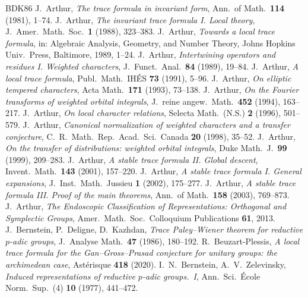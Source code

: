 \documentclass[12pt,letterpaper]{article}
\numberwithin{equation}{section}
\theoremstyle{plain}
\theoremstyle{definition}
\theoremstyle{remark}
\begin{document}
\begin{thebibliography}{BDK86}
 J.~Arthur, \emph{The trace formula in invariant form}, Ann.\ of Math.\ \textbf{114} (1981), 1--74.
 J.~Arthur, \emph{The invariant trace formula I. Local theory}, J.\ Amer.\ Math.\ Soc.\ \textbf{1} (1988), 323--383.
 J.~Arthur, \emph{Towards a local trace formula}, in: Algebraic Analysis, Geometry, and Number Theory, Johns Hopkins Univ.\ Press, Baltimore, 1989, 1--24.
 J.~Arthur, \emph{Intertwining operators and residues I. Weighted characters}, J.\ Funct.\ Anal.\ \textbf{84} (1989), 19--84.
 J.~Arthur, \emph{A local trace formula}, Publ.\ Math.\ IH\'ES \textbf{73} (1991), 5--96.
 J.~Arthur, \emph{On elliptic tempered characters}, Acta Math.\ \textbf{171} (1993), 73--138.
 J.~Arthur, \emph{On the Fourier transforms of weighted orbital integrals}, J.\ reine angew.\ Math.\ \textbf{452} (1994), 163--217.
 J.~Arthur, \emph{On local character relations}, Selecta Math.\ (N.S.) \textbf{2} (1996), 501--579.
 J.~Arthur, \emph{Canonical normalization of weighted characters and a transfer conjecture}, C.\ R.\ Math.\ Rep.\ Acad.\ Sci.\ Canada \textbf{20} (1998), 35--52.
 J.~Arthur, \emph{On the transfer of distributions: weighted orbital integrals}, Duke Math.\ J.\ \textbf{99} (1999), 209--283.
 J.~Arthur, \emph{A stable trace formula II. Global descent}, Invent.\ Math.\ \textbf{143} (2001), 157--220.
 J.~Arthur, \emph{A stable trace formula I. General expansions}, J.\ Inst.\ Math.\ Jussieu \textbf{1} (2002), 175--277.
 J.~Arthur, \emph{A stable trace formula III. Proof of the main theorems}, Ann.\ of Math.\ \textbf{158} (2003), 769--873.
 J.~Arthur, \emph{The Endoscopic Classification of Representations: Orthogonal and Symplectic Groups}, Amer.\ Math.\ Soc.\ Colloquium Publications \textbf{61}, 2013.
 J.~Bernstein, P.~Deligne, D.~Kazhdan, \emph{Trace Paley--Wiener theorem for reductive $p$-adic groups}, J.\ Analyse Math.\ \textbf{47} (1986), 180--192.
 R.~Beuzart-Plessis, \emph{A local trace formula for the Gan--Gross--Prasad conjecture for unitary groups: the archimedean case}, Ast\'erisque \textbf{418} (2020).
 I.~N.~Bernstein, A.~V.~Zelevinsky, \emph{Induced representations of reductive $p$-adic groups.\ I}, Ann.\ Sci.\ \'Ecole Norm.\ Sup.\ (4) \textbf{10} (1977), 441--472.

\end{thebibliography}
\end{document}
